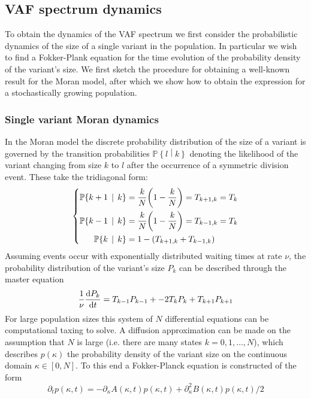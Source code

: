 \documentclass[pdftex,12pt,a4paper]{scrartcl}
\renewcommand{\P}[2]{\mathbb{P} \! \left\lbrace #1 \, \mid \, #2 \right\rbrace }
\begin{document}
\subsection{VAF spectrum dynamics}
To obtain the dynamics of the VAF spectrum we first consider the probabilistic dynamics of the size of a single variant in the population. In particular we wish to find a Fokker-Plank equation for the time evolution of the probability density of the variant's size. We first sketch the procedure for obtaining a well-known result for the Moran model, after which we show how to obtain the expression for a stochastically growing population.

\subsubsection{Single variant Moran dynamics}
In the Moran model the discrete probability distribution of the size of a variant is governed by the transition probabilities $\mathbb{P}\! \left\lbrace l \middle\vert k \right\rbrace$ denoting the likelihood of the variant changing from size $k$ to $l$ after the occurrence of a symmetric division event. These take the tridiagonal form:
\begin{equation}
\left\lbrace
\begin{aligned}
\P{k+1}{k} &= \frac{k}{N} \qty( 1- \frac{k}{N} ) = T_{k+1,k} = T_k\\
\P{k-1}{k} &= \frac{k}{N} \qty( 1- \frac{k}{N} ) = T_{k-1,k} = T_k\\
\P{k}{k} &= 1 - (T_{k+1,k} + T_{k-1,k})
\end{aligned}
\right.
\end{equation}
Assuming events occur with exponentially distributed waiting times at rate $\nu$, the probability distribution of the variant's size $P_k$ can be described through the master equation
\begin{equation}
    \frac{1}{\nu} \dv{P_k}{t} = T_{k-1} P_{k-1} +  -2T_k P_k + T_{k+1}P_{k+1}
\end{equation}
For large population sizes this system of $N$ differential equations can be computational taxing to solve. A diffusion approximation can be made on the assumption that $N$ is large (i.e. there are many states $k=0, 1, \dots, N$), which describes $p(\kappa)$ the probability density of the variant size on the continuous domain $\kappa \in [ 0, N ]$. To this end a Fokker-Planck equation is constructed of the form
\begin{equation}
    \partial_t p(\kappa,t) = -\partial_\kappa A(\kappa,t) p(\kappa, t) + \partial_\kappa^2 B(\kappa,t)p(\kappa, t)/2
\end{equation}
\end{document}
